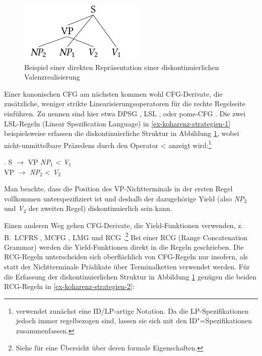 \begin{figure}[t]
\centering
\includegraphics{graphics/abb63.pdf}
\caption{\label{fig-ttmctag-kohaerenz-2}Beispiel einer direkten Repräsentation einer diskontinuierlichen Valenzrealisierung}
\end{figure}

Einer kanonischen CFG am nächsten kommen wohl CFG-Derivate, die zusätzliche, weniger strikte Linearisierungsoperatoren für die rechte Regelseite einführen. Zu nennen sind hier etwa DPSG \citep{Bunt:etal:87}, LSL \citep{Suhre:99}, oder poms-CFG \citep{Nederhof:etal:03}. Die zwei LSL-Regeln (Linear Spezification Language) in \ref{ex-koharenz-strategien-1} beispielsweise erfassen die diskontinuierliche Struktur in Abbildung \ref{fig-ttmctag-kohaerenz-2}, wobei nicht-unmittelbare Präzedens durch den Operator < anzeigt wird:\footnote{\cite{Suhre:99} verwendet zunächst eine ID/LP-artige Notation. Da die LP-Spezifikationen jedoch immer regelbezogen sind, lassen sie sich mit den ID"=Spezifikationen zusammenfassen.}  

\ex. \label{ex-koharenz-strategien-1}
S $\to$ VP {\it NP$_1$} < {\it V$_1$} \\
VP $\to$ {\it NP$_2$} < {\it V$_2$}

Man beachte, dass die Position des VP-Nichtterminals in der ersten Regel vollkommen unterspezifiziert ist und deshalb der dazugehörige Yield (also {\it NP$_2$} und {\it V$_2$} der zweiten Regel) diskontinuierlich sein kann.
	
Einen anderen Weg gehen CFG-Derivate, die Yield-Funktionen verwenden, z.\,B.\ LCFRS \citep{Vijay-Shanker:etal:87,Weir:88}, MCFG \citep{Seki:etal:91}, LMG \citep{Groenink:95} und RCG \citep{Boullier:00}.\footnote{Siehe \citet[Abschnitt~2.2]{Kallmeyer:10} für eine Übersicht über deren formale Eigenschaften.} Bei einer RCG (Range Concatenation Grammar) werden die Yield-Funktionen direkt in die Regeln geschrieben. Die RCG-Regeln unterscheiden sich oberflächlich von CFG-Regeln nur insofern, als statt der Nichtterminale Prädikate über Terminalketten verwendet werden. Für die Erfassung der diskontinuierlichen Struktur in Abbildung \ref{fig-ttmctag-kohaerenz-2} genügen die beiden RCG-Regeln in \ref{ex-koharenz-strategien-2}:  

